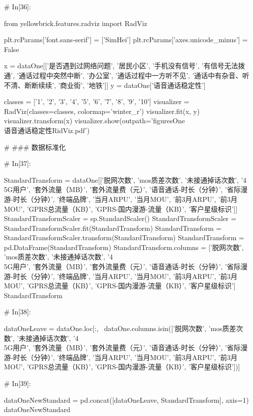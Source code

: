 \documentclass{MathorCupmodeling}
\begin{document}
\begin{python}
	# In[36]:
	
	
	from yellowbrick.features.radviz import RadViz
	
	plt.rcParams['font.sans-serif'] = ['SimHei']
	plt.rcParams['axes.unicode_minus'] = False
	
	x = dataOne[['是否遇到过网络问题', '居民小区', '手机没有信号', '有信号无法拨通', '通话过程中突然中断', '办公室', '通话过程中一方听不见', '通话中有杂音、听不清、断断续续', '商业街', '地铁']]
	y = dataOne['语音通话稳定性']
	
	classes = ['1', '2', '3', '4', '5', '6', '7', '8', '9', '10']
	visualizer = RadViz(classes=classes, colormap='winter_r')
	visualizer.fit(x, y)
	visualizer.transform(x)
	visualizer.show(outpath='figuresOne\\[附件1]语音通话稳定性RidViz.pdf')
	
	# ### 数据标准化
	
	# In[37]:
	
	
	StandardTransform = dataOne[['脱网次数', 'mos质差次数', '未接通掉话次数', '4\\5G用户', '套外流量（MB）', '套外流量费（元）', '语音通话-时长（分钟）', '省际漫游-时长（分钟）', '终端品牌', '当月ARPU', '当月MOU', '前3月ARPU', '前3月MOU', 'GPRS总流量（KB）', 'GPRS-国内漫游-流量（KB）', '客户星级标识']]
	StandardTransformScaler = sp.StandardScaler()
	StandardTransformScaler = StandardTransformScaler.fit(StandardTransform)
	StandardTransform = StandardTransformScaler.transform(StandardTransform)
	StandardTransform = pd.DataFrame(StandardTransform)
	StandardTransform.columns = ['脱网次数', 'mos质差次数', '未接通掉话次数', '4\\5G用户', '套外流量（MB）', '套外流量费（元）', '语音通话-时长（分钟）', '省际漫游-时长（分钟）', '终端品牌', '当月ARPU', '当月MOU', '前3月ARPU', '前3月MOU', 'GPRS总流量（KB）', 'GPRS-国内漫游-流量（KB）', '客户星级标识']
	StandardTransform
	
	# In[38]:
	
	
	dataOneLeave = dataOne.loc[:, ~dataOne.columns.isin(['脱网次数', 'mos质差次数', '未接通掉话次数', '4\\5G用户', '套外流量（MB）', '套外流量费（元）', '语音通话-时长（分钟）', '省际漫游-时长（分钟）', '终端品牌', '当月ARPU', '当月MOU', '前3月ARPU', '前3月MOU', 'GPRS总流量（KB）', 'GPRS-国内漫游-流量（KB）', '客户星级标识'])]
	
	# In[39]:
	
	
	dataOneNewStandard = pd.concat([dataOneLeave, StandardTransform], axis=1)
	dataOneNewStandard
	

\end{python}
\end{document}
